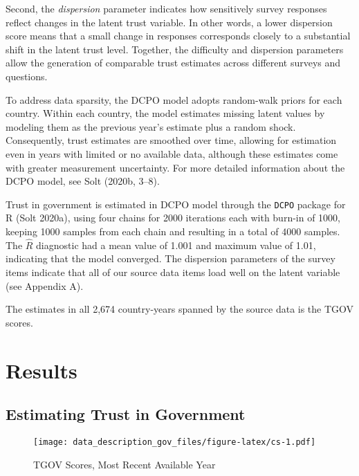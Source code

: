 \documentclass[
  12pt,
]{article}
\begin{document}
Second, the \emph{dispersion} parameter indicates how sensitively survey responses reflect changes in the latent trust variable.
In other words, a lower dispersion score means that a small change in responses corresponds closely to a substantial shift in the latent trust level.
Together, the difficulty and dispersion parameters allow the generation of comparable trust estimates across different surveys and questions.

To address data sparsity, the DCPO model adopts random-walk priors for each country.
Within each country, the model estimates missing latent values by modeling them as the previous year's estimate plus a random shock.
Consequently, trust estimates are smoothed over time, allowing for estimation even in years with limited or no available data, although these estimates come with greater measurement uncertainty.
For more detailed information about the DCPO model, see Solt (2020b, 3--8).

Trust in government is estimated in DCPO model through the \texttt{DCPO} package for R (Solt 2020a), using four chains for 2000 iterations each with burn-in of 1000, keeping 1000 samples from each chain and resulting in a total of 4000 samples.
The \(\hat{R}\) diagnostic had a mean value of 1.001 and maximum value of 1.01, indicating that the model converged.
The dispersion parameters of the survey items indicate that all of our source data items load well on the latent variable (see Appendix A).

The estimates in all 2,674 country-years spanned by the source data is the TGOV scores.

\section{Results}\label{results}

\subsection{Estimating Trust in Government}\label{estimating-trust-in-government}

\begin{figure}
\centering
\texttt{[image: data\_description\_gov\_files/figure-latex/cs-1.pdf]}
\caption{\label{fig:cs}TGOV Scores, Most Recent Available Year \label{cs_mry}}
\end{figure}
\end{document}
